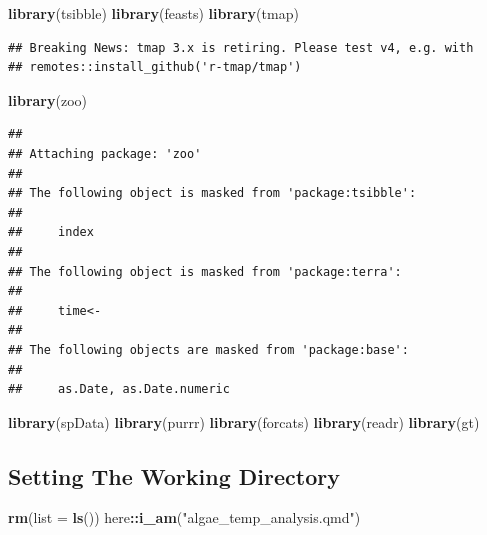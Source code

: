 \documentclass[
]{article}
\newenvironment{Shaded}{\begin{snugshade}}{\end{snugshade}}
\newcommand{\AttributeTok}[1]{\textcolor[rgb]{0.13,0.29,0.53}{#1}}
\newcommand{\FunctionTok}[1]{\textcolor[rgb]{0.13,0.29,0.53}{\textbf{#1}}}
\newcommand{\NormalTok}[1]{#1}
\newcommand{\SpecialCharTok}[1]{\textcolor[rgb]{0.81,0.36,0.00}{\textbf{#1}}}
\newcommand{\StringTok}[1]{\textcolor[rgb]{0.31,0.60,0.02}{#1}}
\begin{document}
\begin{Shaded}
\begin{Highlighting}[]
\FunctionTok{library}\NormalTok{(tsibble)}
\FunctionTok{library}\NormalTok{(feasts)}
\FunctionTok{library}\NormalTok{(tmap)}
\end{Highlighting}
\end{Shaded}

\begin{verbatim}
## Breaking News: tmap 3.x is retiring. Please test v4, e.g. with
## remotes::install_github('r-tmap/tmap')
\end{verbatim}

\begin{Shaded}
\begin{Highlighting}[]
\FunctionTok{library}\NormalTok{(zoo)}
\end{Highlighting}
\end{Shaded}

\begin{verbatim}
## 
## Attaching package: 'zoo'
## 
## The following object is masked from 'package:tsibble':
## 
##     index
## 
## The following object is masked from 'package:terra':
## 
##     time<-
## 
## The following objects are masked from 'package:base':
## 
##     as.Date, as.Date.numeric
\end{verbatim}

\begin{Shaded}
\begin{Highlighting}[]
\FunctionTok{library}\NormalTok{(spData)}
\FunctionTok{library}\NormalTok{(purrr)}
\FunctionTok{library}\NormalTok{(forcats)}
\FunctionTok{library}\NormalTok{(readr)}
\FunctionTok{library}\NormalTok{(gt)}
\end{Highlighting}
\end{Shaded}

\hypertarget{setting-the-working-directory}{%
\subsection{Setting The Working
Directory}\label{setting-the-working-directory}}

\begin{Shaded}
\begin{Highlighting}[]
\FunctionTok{rm}\NormalTok{(}\AttributeTok{list =} \FunctionTok{ls}\NormalTok{())}
\NormalTok{here}\SpecialCharTok{::}\FunctionTok{i\_am}\NormalTok{(}\StringTok{"algae\_temp\_analysis.qmd"}\NormalTok{)}
\end{Highlighting}
\end{Shaded}
\end{document}

